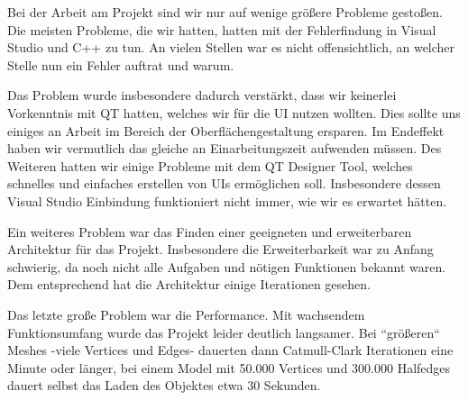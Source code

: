 
Bei der Arbeit am Projekt sind wir nur auf wenige größere Probleme gestoßen. 
Die meisten Probleme, die wir hatten, hatten mit der Fehlerfindung in Visual Studio und C++ zu tun. 
An vielen Stellen war es nicht offensichtlich, an welcher Stelle nun ein Fehler auftrat und warum. 

Das Problem wurde insbesondere dadurch verstärkt, dass wir keinerlei Vorkenntnis mit QT hatten, welches wir für die UI nutzen wollten. 
Dies sollte uns einiges an Arbeit im Bereich der Oberflächengestaltung ersparen.
Im Endeffekt haben wir vermutlich das gleiche an Einarbeitungszeit aufwenden müssen. 
Des Weiteren hatten wir einige Probleme mit dem QT Designer Tool, welches schnelles und einfaches erstellen von UIs ermöglichen soll. 
Insbesondere dessen Visual Studio Einbindung funktioniert nicht immer, wie wir es erwartet hätten. 

Ein weiteres Problem war das Finden einer geeigneten und erweiterbaren Architektur für das Projekt. 
Insbesondere die Erweiterbarkeit war zu Anfang schwierig, da noch nicht alle Aufgaben und nötigen Funktionen bekannt waren.
Dem entsprechend hat die Architektur einige Iterationen gesehen.

Das letzte große Problem war die Performance. 
Mit wachsendem Funktionsumfang wurde das Projekt leider deutlich langsamer. 
Bei ``größeren`` Meshes -viele Vertices und Edges- dauerten dann Catmull-Clark Iterationen eine Minute oder länger, bei einem Model mit 50.000 Vertices und 300.000 Halfedges dauert selbst das Laden des Objektes etwa 30 Sekunden.
